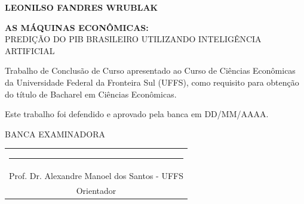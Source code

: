 \documentclass[        
a4paper,          
12pt,             
chapter=TITLE,   
section=Title,    
subsection=Title,
oneside,          
english,          
spanish,          
brazil,           
fleqn            
]{lib/abntex2}
\begin{document}

        \begin{folhadeaprovacao}
            
            \begin{center}
                {\textbf{LEONILSO FANDRES WRUBLAK}}
                
                \vspace*{2cm}
                
                {\textbf{AS MÁQUINAS ECONÔMICAS:}}\\
                \vspace{0.5cm}
                {PREDIÇÃO DO PIB BRASILEIRO UTILIZANDO INTELIGÊNCIA ARTIFICIAL}
            \end{center}
            
            \vspace{2cm}
            
            \hfill
            \parbox{8cm}{
                Trabalho de Conclusão de Curso apresentado ao Curso de Ciências Econômicas da
                Universidade Federal da Fronteira Sul (UFFS), como requisito para obtenção do
                título de Bacharel em Ciências Econômicas.}
            
            \vspace{1.5cm}
            
            \noindent
            \begin{center}
                        Este trabalho foi defendido e aprovado pela banca em DD/MM/AAAA.
            \end{center}
                    
            \vspace{2cm}
            
            \begin{center}
                BANCA EXAMINADORA
            \end{center}
            
            \vspace{1.5cm}
            
            \noindent
            \begin{center}
                \begin{tabular}{c}
                    \rule{10cm}{0.4pt}\\
                    Prof. Dr. Alexandre Manoel dos Santos - UFFS\\
                    Orientador
                \end{tabular}
            \end{center}
            

\end{folhadeaprovacao}
\end{document}
